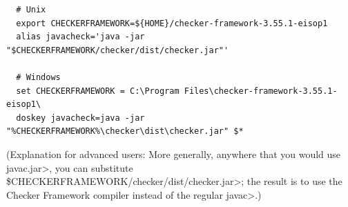 \begin{itemize}
\begin{Verbatim}
  # Unix
  export CHECKERFRAMEWORK=${HOME}/checker-framework-3.55.1-eisop1
  alias javacheck='java -jar "$CHECKERFRAMEWORK/checker/dist/checker.jar"'

  # Windows
  set CHECKERFRAMEWORK = C:\Program Files\checker-framework-3.55.1-eisop1\
  doskey javacheck=java -jar "%CHECKERFRAMEWORK%\checker\dist\checker.jar" $*
\end{Verbatim}

  (Explanation for advanced users:
  More generally, anywhere that you would use \<javac.jar>, you can substitute
  \<\$CHECKERFRAMEWORK/checker/dist/checker.jar>;
  the result is to use the Checker
  Framework compiler instead of the regular \<javac>.)

\end{itemize}



%
%
%
%
%
%
%
%


